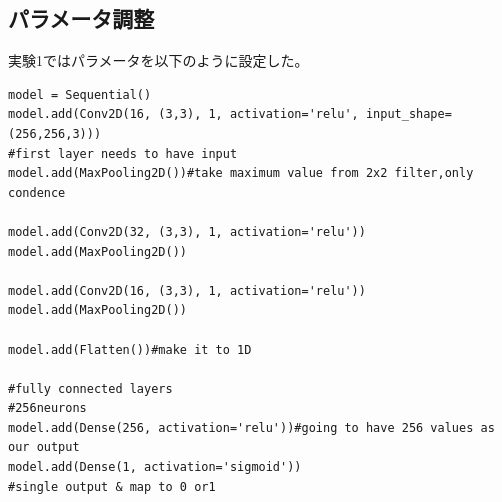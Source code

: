 \documentclass[a4paper, 11pt, titlepage]{jsarticle}
\begin{document}
\subsection{パラメータ調整}
実験1ではパラメータを以下のように設定した。\par

\begin{lstlisting}[caption=パラメータ(実験1),label=fuga]
model = Sequential()
model.add(Conv2D(16, (3,3), 1, activation='relu', input_shape=(256,256,3))) 
#first layer needs to have input
model.add(MaxPooling2D())#take maximum value from 2x2 filter,only condence 

model.add(Conv2D(32, (3,3), 1, activation='relu'))
model.add(MaxPooling2D())

model.add(Conv2D(16, (3,3), 1, activation='relu'))
model.add(MaxPooling2D())

model.add(Flatten())#make it to 1D

#fully connected layers
#256neurons
model.add(Dense(256, activation='relu'))#going to have 256 values as our output
model.add(Dense(1, activation='sigmoid'))
#single output & map to 0 or1
\end{lstlisting}
\end{document}
